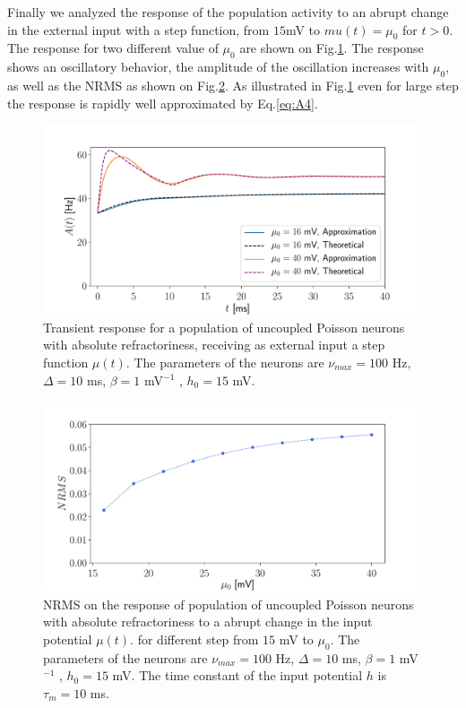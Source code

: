 \documentclass[12pt,twoside]{report}
\begin{document}
Finally we analyzed the response of the population activity to an abrupt change in the external input with a step function, from $15$mV to $mu(t)=\mu_0$ for $t>0$. The response for two different value of $\mu_0$ are shown on Fig.\ref{fig:Astep}. The response shows an oscillatory behavior, the amplitude of the oscillation increases with $\mu_0$, as well as the NRMS as shown on Fig.\ref{fig:NRMSstep}.  As illustrated in Fig.\ref{fig:Astep} even for large step the response is rapidly well approximated by Eq.\ref{eq:A4}.

\begin{figure}[h!]
	\centering
	\includegraphics[width=0.8\linewidth]{Astep.pdf}
	\caption{Transient response for a population of uncoupled Poisson neurons with absolute refractoriness, receiving as external input a step function $\mu(t)$. The parameters of the neurons are $\nu_{max}=100$ Hz, $\Delta=10$ ms, $\beta=1$ mV$^{-1}$ , $h_0=15$ mV. 
	}
	\label{fig:Astep}
\end{figure}

\begin{figure}[h!]
	\centering
	\includegraphics[width=0.8\linewidth]{NRMSstep.pdf}
	\caption{NRMS on the response of population of uncoupled Poisson neurons with absolute refractoriness to a abrupt change in the input potential $\mu(t)$. for different step from $15$ mV to $\mu_0$. The parameters of the neurons are $\nu_{max}=100$ Hz, $\Delta=10$ ms, $\beta=1$ mV$^{-1}$ , $h_0=15$ mV. The time constant of the input potential $h$ is $\tau_m=10$ ms.
	}
	\label{fig:NRMSstep}
\end{figure}
\end{document}
